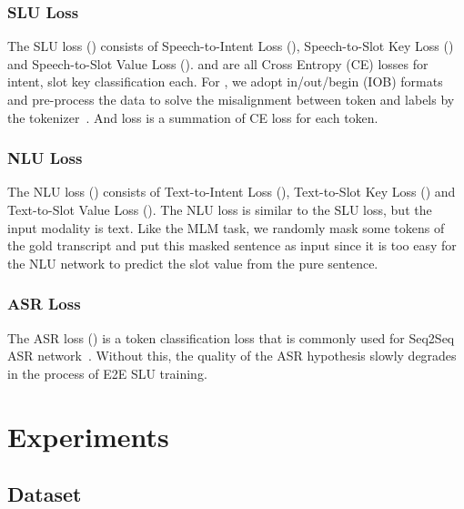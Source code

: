 \documentclass{article}
\begin{document}
\vspace{-5mm}

\vspace{-4mm}
\subsubsection{SLU Loss}

The SLU loss () consists of Speech-to-Intent Loss (), Speech-to-Slot Key Loss () and Speech-to-Slot Value Loss ().
 and  are all Cross Entropy (CE) losses for intent, slot key classification each.
For , we adopt in/out/begin (IOB) formats and pre-process the data to solve the misalignment between token and labels by the tokenizer~\cite{mesnil2014using}.
And  loss is a summation of CE loss for each token.




\vspace{-4mm}
\subsubsection{NLU Loss}
The NLU loss () consists of Text-to-Intent Loss (), Text-to-Slot Key Loss () and Text-to-Slot Value Loss ().
The NLU loss is similar to the SLU loss, but the input modality is text.
Like the MLM task, we randomly mask some tokens of the gold transcript and put this masked sentence as input since it is too easy for the NLU network to predict the slot value from the pure sentence.




\vspace{-4mm}
\subsubsection{ASR Loss}
The ASR loss () is a token classification loss that is commonly used for Seq2Seq ASR network~\cite{chan2016listen}. 
Without this, the quality of the ASR hypothesis slowly degrades in the process of E2E SLU training.



\vspace{-2mm}
\section{Experiments}


\vspace{-4mm}
\subsection{Dataset}
\end{document}
